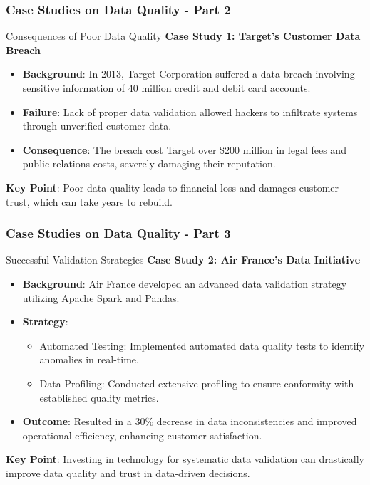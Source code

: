 \documentclass[aspectratio=169]{beamer}
\begin{document}
\begin{frame}[fragile]
    \frametitle{Case Studies on Data Quality - Part 2}
    
    \begin{block}{Consequences of Poor Data Quality}
        \textbf{Case Study 1: Target's Customer Data Breach}
        \begin{itemize}
            \item \textbf{Background}: In 2013, Target Corporation suffered a data breach involving sensitive information of 40 million credit and debit card accounts.
            \item \textbf{Failure}: Lack of proper data validation allowed hackers to infiltrate systems through unverified customer data.
            \item \textbf{Consequence}: The breach cost Target over \$200 million in legal fees and public relations costs, severely damaging their reputation.
        \end{itemize}
        \textbf{Key Point}: Poor data quality leads to financial loss and damages customer trust, which can take years to rebuild.
    \end{block}
\end{frame}

\begin{frame}[fragile]
    \frametitle{Case Studies on Data Quality - Part 3}

    \begin{block}{Successful Validation Strategies}
        \textbf{Case Study 2: Air France's Data Initiative}
        \begin{itemize}
            \item \textbf{Background}: Air France developed an advanced data validation strategy utilizing Apache Spark and Pandas.
            \item \textbf{Strategy}:
            \begin{itemize}
                \item Automated Testing: Implemented automated data quality tests to identify anomalies in real-time.
                \item Data Profiling: Conducted extensive profiling to ensure conformity with established quality metrics.
            \end{itemize}
            \item \textbf{Outcome}: Resulted in a 30\% decrease in data inconsistencies and improved operational efficiency, enhancing customer satisfaction.
        \end{itemize}
        \textbf{Key Point}: Investing in technology for systematic data validation can drastically improve data quality and trust in data-driven decisions.
    \end{block}
\end{frame}
\end{document}
